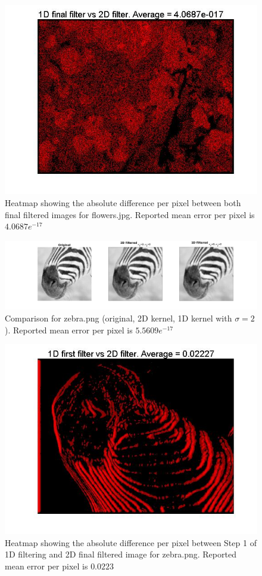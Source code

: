 \documentclass[11pt]{article}
\begin{document}
\begin{figure}[H] \centering
	\includegraphics[width=.9\textwidth]{imgs/flowers_heatmap.jpg}
	\caption{Heatmap showing the absolute difference per pixel between both
		final filtered images for flowers.jpg. Reported mean error per pixel is
		$4.0687 e^{-17}$}
	\label{fig:flowers_heatmap}
\end{figure}

\begin{figure}[H] \centering
	\includegraphics[width=1\textwidth]{imgs/zebra_conv.jpg}
	\caption{Comparison for zebra.png (original, 2D kernel, 1D kernel with
					$\sigma=2$). Reported mean error per pixel is $5.5609 e^{-17}$}
	\label{fig:zebra}
\end{figure}

\begin{figure}[H] \centering
	\includegraphics[width=.9\textwidth]{imgs/zebra_col_heatmap.jpg}
	\caption{Heatmap showing the absolute difference per pixel between Step
		1 of 1D filtering and 2D final filtered image for zebra.png. Reported
		mean error per pixel is $0.0223$}
	\label{fig:zebra_col_heatmap}
\end{figure}
\end{document}
